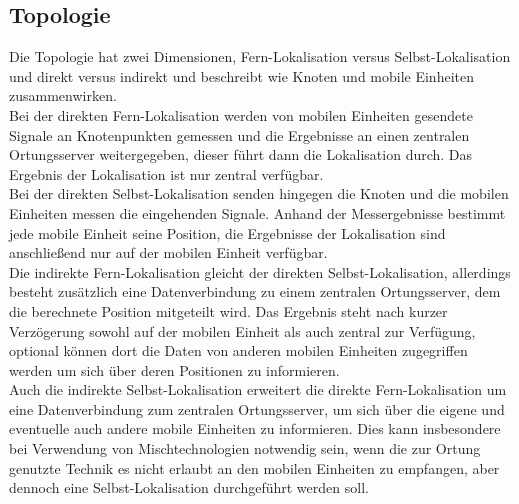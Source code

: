 \subsection{Topologie}
Die Topologie hat zwei Dimensionen, Fern-Lokalisation versus Selbst-Lokalisation und direkt versus indirekt und beschreibt wie Knoten und mobile Einheiten zusammenwirken. \\
Bei der direkten Fern-Lokalisation werden von mobilen Einheiten gesendete Signale an Knotenpunkten gemessen und die Ergebnisse an einen zentralen Ortungsserver weitergegeben, dieser führt dann die Lokalisation durch. Das Ergebnis der Lokalisation ist nur zentral verfügbar. \\
Bei der direkten Selbst-Lokalisation senden hingegen die Knoten und die mobilen Einheiten messen die eingehenden Signale. Anhand der Messergebnisse bestimmt jede mobile Einheit seine Position, die Ergebnisse der Lokalisation sind anschließend nur auf der mobilen Einheit verfügbar. \\
Die indirekte Fern-Lokalisation gleicht der direkten Selbst-Lokalisation, allerdings besteht zusätzlich eine Datenverbindung zu einem zentralen Ortungsserver, dem die berechnete Position mitgeteilt wird. Das Ergebnis steht nach kurzer Verzögerung sowohl auf der mobilen Einheit als auch zentral zur Verfügung, optional können dort die Daten von anderen mobilen Einheiten zugegriffen werden um sich über deren Positionen zu informieren. \\
Auch die indirekte Selbst-Lokalisation erweitert die direkte Fern-Lokalisation um eine Datenverbindung zum zentralen Ortungsserver, um sich über die eigene und eventuelle auch andere mobile Einheiten zu informieren. Dies kann insbesondere bei Verwendung von Mischtechnologien notwendig sein, wenn die zur Ortung genutzte Technik es nicht erlaubt an den mobilen Einheiten zu empfangen, aber dennoch eine Selbst-Lokalisation durchgeführt werden soll.

